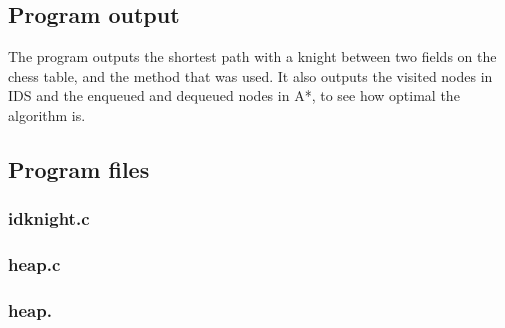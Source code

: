 \documentclass{article}
\begin{document}
\subsection*{Program output}
The program outputs the shortest path with a knight between two fields on the chess table, and the method that was used. It also outputs the visited nodes in IDS and the enqueued and dequeued nodes in A*, to see how optimal the algorithm is.

\subsection*{Program files}
\subsubsection*{idknight.c}

\subsubsection*{heap.c}

\subsubsection*{heap.}

\end{document}
